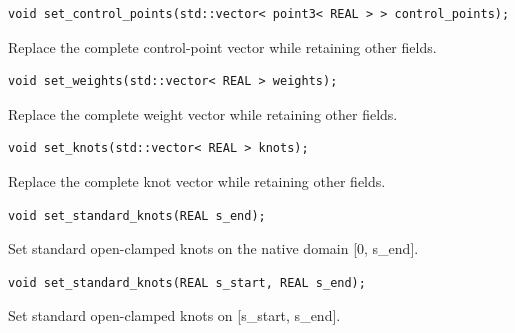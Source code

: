\par\noindent\begin{minipage}{\linewidth}
\begin{lstlisting}[style=apireference]
void set_control_points(std::vector< point3< REAL > > control_points);
\end{lstlisting}
{\footnotesize Replace the complete control-point vector while retaining other fields.\par}
\end{minipage}\par\vspace{1pt}
\par\noindent\begin{minipage}{\linewidth}
\begin{lstlisting}[style=apireference]
void set_weights(std::vector< REAL > weights);
\end{lstlisting}
{\footnotesize Replace the complete weight vector while retaining other fields.\par}
\end{minipage}\par\vspace{1pt}
\par\noindent\begin{minipage}{\linewidth}
\begin{lstlisting}[style=apireference]
void set_knots(std::vector< REAL > knots);
\end{lstlisting}
{\footnotesize Replace the complete knot vector while retaining other fields.\par}
\end{minipage}\par\vspace{1pt}
\par\noindent\begin{minipage}{\linewidth}
\begin{lstlisting}[style=apireference]
void set_standard_knots(REAL s_end);
\end{lstlisting}
{\footnotesize Set standard open-clamped knots on the native domain [0, s\_end].\par}
\end{minipage}\par\vspace{1pt}
\par\noindent\begin{minipage}{\linewidth}
\begin{lstlisting}[style=apireference]
void set_standard_knots(REAL s_start, REAL s_end);
\end{lstlisting}
{\footnotesize Set standard open-clamped knots on [s\_start, s\_end].\par}
\end{minipage}\par\vspace{1pt}
